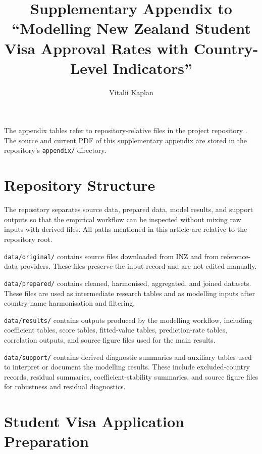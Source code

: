 \documentclass[runningheads]{llncs}
\begin{document}
\title{Supplementary Appendix to ``Modelling New Zealand Student Visa Approval Rates with Country-Level Indicators''}

\author{Vitalii Kaplan}

\maketitle
\appendix

The appendix tables refer to repository-relative files in the project repository \cite{KaplanINZRepo}. The source and current PDF of this supplementary appendix are stored in the repository's \texttt{appendix/} directory.

\section{Repository Structure}
\label{app:repository-structure}

The repository separates source data, prepared data, model results, and support outputs so that the empirical workflow can be inspected without mixing raw inputs with derived files. All paths mentioned in this article are relative to the repository root.

\texttt{data/original/} contains source files downloaded from INZ and from reference-data providers. These files preserve the input record and are not edited manually.

\texttt{data/prepared/} contains cleaned, harmonised, aggregated, and joined datasets. These files are used as intermediate research tables and as modelling inputs after country-name harmonisation and filtering.

\texttt{data/results/} contains outputs produced by the modelling workflow, including coefficient tables, score tables, fitted-value tables, prediction-rate tables, correlation outputs, and source figure files used for the main results.

\texttt{data/support/} contains derived diagnostic summaries and auxiliary tables used to interpret or document the modelling results. These include excluded-country records, residual summaries, coefficient-stability summaries, and source figure files for robustness and residual diagnostics.

\section{Student Visa Application Preparation}
\label{app:student-visa-preparation}
\end{document}
